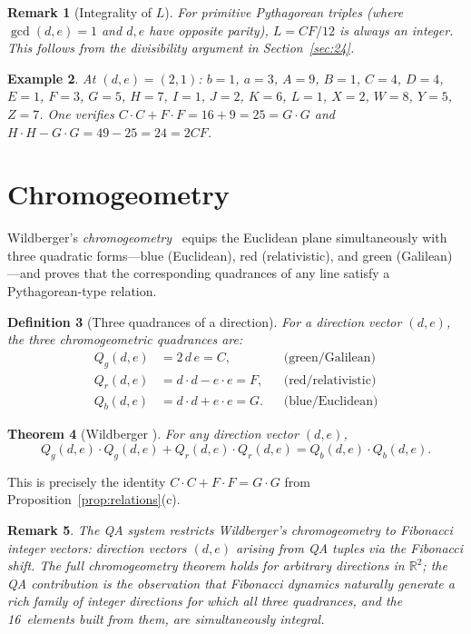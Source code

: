 \documentclass[11pt]{article}
\newtheorem{definition}{Definition}[section]
\newtheorem{theorem}[definition]{Theorem}
\newtheorem{remark}[definition]{Remark}
\newtheorem{example}[definition]{Example}
\begin{document}
\begin{remark}[Integrality of $L$]
For primitive Pythagorean triples (where $\gcd(d,e)=1$ and $d,e$ have opposite parity), $L = CF/12$ is always an integer.  This follows from the divisibility argument in Section~\ref{sec:24}.
\end{remark}

\begin{example}
At $(d,e) = (2,1)$: $b=1$, $a=3$, $A=9$, $B=1$, $C=4$, $D=4$, $E=1$, $F=3$, $G=5$, $H=7$, $I=1$, $J=2$, $K=6$, $L=1$, $X=2$, $W=8$, $Y=5$, $Z=7$.  One verifies $C\cdot C + F\cdot F = 16 + 9 = 25 = G\cdot G$ and $H\cdot H - G\cdot G = 49 - 25 = 24 = 2CF$.
\end{example}

\section{Chromogeometry}\label{sec:chromo}

Wildberger's \emph{chromogeometry}~\cite{wildberger2005,wildberger2010} equips the Euclidean plane simultaneously with three quadratic forms---blue (Euclidean), red (relativistic), and green (Galilean)---and proves that the corresponding quadrances of any line satisfy a Pythagorean-type relation.

\begin{definition}[Three quadrances of a direction]
For a direction vector $(d,e)$, the three chromogeometric quadrances are:
\begin{align*}
  Q_g(d,e) &= 2\,d\,e = C, & &\text{(green/Galilean)}\\
  Q_r(d,e) &= d\cdot d - e\cdot e = F, & &\text{(red/relativistic)}\\
  Q_b(d,e) &= d\cdot d + e\cdot e = G. & &\text{(blue/Euclidean)}
\end{align*}
\end{definition}

\begin{theorem}[Wildberger {\cite[Theorem~6]{wildberger2005}}]
For any direction vector $(d,e)$,
\[
  Q_g(d,e)\cdot Q_g(d,e) + Q_r(d,e)\cdot Q_r(d,e) = Q_b(d,e)\cdot Q_b(d,e).
\]
\end{theorem}

This is precisely the identity $C\cdot C + F\cdot F = G\cdot G$ from Proposition~\ref{prop:relations}(c).

\begin{remark}
The QA system restricts Wildberger's chromogeometry to \emph{Fibonacci integer vectors}: direction vectors $(d,e)$ arising from QA tuples via the Fibonacci shift.  The full chromogeometry theorem holds for arbitrary directions in $\mathbb{R}^2$; the QA contribution is the observation that Fibonacci dynamics naturally generate a rich family of integer directions for which all three quadrances, and the 16~elements built from them, are simultaneously integral.
\end{remark}
\end{document}
